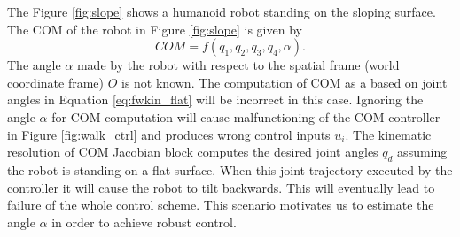 The Figure \ref{fig:slope} shows a humanoid robot standing on the sloping surface. %
 The COM of the robot in Figure \ref{fig:slope} is given by $$COM = f(q_1,q_2,q_3,q_4,\alpha).$$  The angle $\alpha$ made by the robot with respect to the spatial frame (world coordinate frame) $O$ is not known. The computation of COM as a based on joint angles in Equation \ref{eq:fwkin_flat} will be incorrect in this case. Ignoring the angle $\alpha$ for COM computation will cause malfunctioning of the COM controller in Figure \ref{fig:walk_ctrl} and produces wrong control inputs $u_i$. The kinematic resolution of COM Jacobian block computes the desired joint angles $q_d$ assuming the robot is standing on a flat surface. When this joint trajectory executed by the controller it will cause the robot to tilt backwards. This will eventually lead to failure of the whole control scheme. This scenario motivates us to estimate the angle $\alpha$ in order to achieve robust control.  

